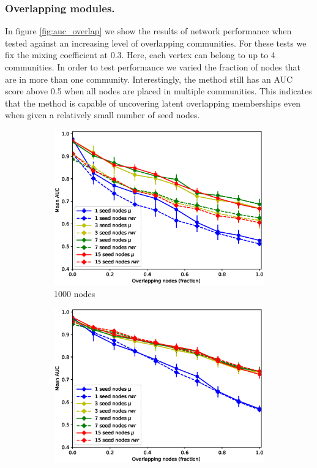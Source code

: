 \documentclass[sigconf]{acmart}
\begin{document}
\subsubsection{Overlapping modules.} 
In figure \ref{fig:auc_overlap} we show the results of network performance when tested against an increasing level of overlapping communities.
For these tests we fix the mixing coefficient at $0.3$.
Here, each vertex can belong to up to 4 communities.
In order to test performance we varied the fraction of nodes that are in more than one community.
Interestingly, the method still has an AUC score above 0.5 when all nodes are placed in multiple communities.
This indicates that the method is capable of uncovering latent overlapping memberships even when given a relatively small number of seed nodes.

\begin{figure}[t]
    \centering
    \begin{subfigure}[b]{0.23\textwidth}
        \centering
        \includegraphics[width=\textwidth]{images/lfr_binary_overlap_auc_1000.eps}
        \caption{1000 nodes}
    \end{subfigure}
    \begin{subfigure}[b]{0.23\textwidth}
        \centering
        \includegraphics[width=\textwidth]{images/lfr_binary_overlap_auc_5000.eps}

\end{subfigure}
\end{figure}
\end{document}
